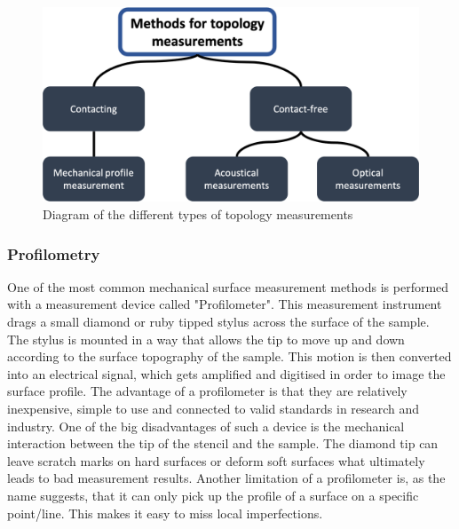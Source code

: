 \begin{figure}
\begin{center}
\includegraphics[width=12cm]{Pictures/TopologyMM}
\caption[Diagram of the different types of topology measurements]{Diagram of the different types of topology measurements\cite{Lake2016}}
\label{TopologyMM}
\end{center}
\end{figure}

\subsubsection{Profilometry}
One of the most common mechanical surface measurement methods is performed with a measurement device called "Profilometer". This measurement instrument drags a small diamond or ruby tipped stylus across the surface of the sample. The stylus is mounted in a way that allows the tip to move up and down according to the surface topography of the sample. This motion is then converted into an electrical signal, which gets amplified and digitised in order to image the surface profile. The advantage of a profilometer is that they are relatively inexpensive, simple to use and connected to valid standards in research and industry. One of the big disadvantages of such a device is the mechanical interaction between the tip of the stencil and the sample. The diamond tip can leave scratch marks on hard surfaces or deform soft surfaces what ultimately leads to bad measurement results. Another limitation of a profilometer is, as the name suggests, that it can only pick up the profile of a surface on a specific point/line. This makes it easy to miss local imperfections.\cite{Rebeggiani2009}\cite{Lake2016}

